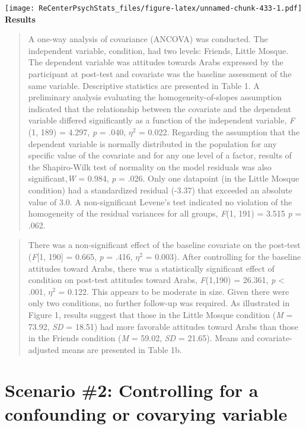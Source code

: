 \documentclass[
  11pt,
]{book}
\begin{document}
\texttt{[image: ReCenterPsychStats\_files/figure-latex/unnamed-chunk-433-1.pdf]}
\textbf{Results}

\begin{quote}
A one-way analysis of covariance (ANCOVA) was conducted. The independent variable, condition, had two levels: Friends, Little Mosque. The dependent variable was attitudes towards Arabs expressed by the participant at post-test and covariate was the baseline assessment of the same variable. Descriptive statistics are presented in Table 1. A preliminary analysis evaluating the homogeneity-of-slopes assumption indicated that the relationship between the covariate and the dependent variable differed significantly as a function of the independent variable, \emph{F} (1, 189) = 4.297, \emph{p} = .040, \(\eta^2\) = 0.022. Regarding the assumption that the dependent variable is normally distributed in the population for any specific value of the covariate and for any one level of a factor, results of the Shapiro-Wilk test of normality on the model residuals was also significant,\emph{W} = 0.984, \emph{p} = .026. Only one datapoint (in the Little Mosque condition) had a standardized residual (-3.37) that exceeded an absolute value of 3.0. A non-significant Levene's test indicated no violation of the homogeneity of the residual variances for all groups, \emph{F}(1, 191) = 3.515 \emph{p} = .062.
\end{quote}

\begin{quote}
There was a non-significant effect of the baseline covariate on the post-test (\emph{F}{[}1, 190{]} = 0.665, \emph{p} = .416, \(\eta^2\) = 0.003). After controlling for the baseline attitudes toward Arabs, there was a statistically significant effect of condition on post-test attitudes toward Arabs, \emph{F}(1,190) = 26.361, \emph{p} \textless{} .001, \(\eta^2\) = 0.122. This appears to be moderate in size. Given there were only two conditions, no further follow-up was required. As illustrated in Figure 1, results suggest that those in the Little Mosque condition (\emph{M} = 73.92, \emph{SD} = 18.51) had more favorable attitudes toward Arabs than those in the Friends condition (\emph{M} = 59.02, \emph{SD} = 21.65). Means and covariate-adjusted means are presented in Table 1b.
\end{quote}

\hypertarget{scenario-2-controlling-for-a-confounding-or-covarying-variable}{%
\section{Scenario \#2: Controlling for a confounding or covarying variable}\label{scenario-2-controlling-for-a-confounding-or-covarying-variable}}
\end{document}
